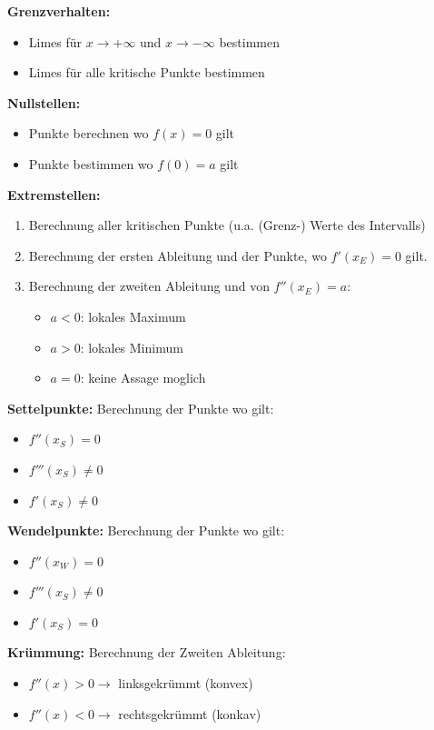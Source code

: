 \documentclass[a4paper,8pt]{extarticle}
\begin{document}
\textbf{Grenzverhalten:}
\begin{itemize}
  \item Limes für $x \to +\infty$ und $x \to -\infty$ bestimmen
  \item Limes für alle kritische Punkte bestimmen
\end{itemize}

\textbf{Nullstellen:}
\begin{itemize}
  \item Punkte berechnen wo $f(x) = 0$ gilt
  \item Punkte bestimmen wo $f(0) = a$ gilt
\end{itemize}

\textbf{Extremstellen:}
\begin{enumerate}
  \item Berechnung aller kritischen Punkte (u.a.
  (Grenz-) Werte des Intervalls)
  \item Berechnung der ersten Ableitung und der
  Punkte, wo $f'(x_E) = 0$ gilt.
  \item  Berechnung der zweiten Ableitung und von $f''(x_E) = a$:
        \begin{itemize}
          \item $a < 0$: lokales Maximum
          \item $a > 0$: lokales Minimum
          \item $a = 0$: keine Assage moglich
        \end{itemize}
\end{enumerate}

\textbf{Settelpunkte:} Berechnung der Punkte wo gilt:
\begin{itemize}
  \item $f''(x_S) = 0$
  \item $f'''(x_S) \neq 0$
  \item $f'(x_S) \neq 0$
\end{itemize}

\textbf{Wendelpunkte:} Berechnung der Punkte wo gilt:
\begin{itemize}
  \item $f''(x_W) = 0$
  \item $f'''(x_S) \neq 0$
  \item $f'(x_S) = 0$
\end{itemize}

\textbf{Krümmung:} Berechnung der Zweiten Ableitung:
\begin{itemize}
  \item $f''(x) > 0 \rightarrow$ linksgekrümmt (konvex)
  \item $f''(x) < 0 \rightarrow$ rechtsgekrümmt (konkav)
\end{itemize}
\end{document}
